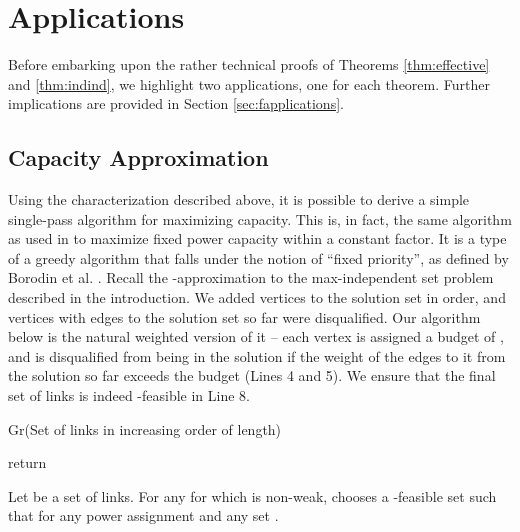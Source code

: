\documentclass[11pt]{amsart}
\begin{document}
\section{Applications}
\label{sec:applications}
Before embarking upon the rather technical proofs of Theorems
\ref{thm:effective} and \ref{thm:indind}, we highlight two
applications, one for each theorem. Further implications are provided
in Section \ref{sec:fapplications}.

\subsection{Capacity Approximation}
\label{sec:capacity}

Using the characterization described above, it is possible to derive a simple single-pass
algorithm for maximizing capacity. This is, in fact, the same
algorithm as used in \cite{SODA11} to maximize fixed power capacity
within a constant factor. 
It is a type of a greedy algorithm that falls under the notion of ``fixed priority'', as defined by 
Borodin et al. \cite{BorodinPriority}.
Recall the -approximation to the max-independent set problem described in the introduction. We added vertices to
the solution set in order, and vertices with edges to the solution set so far were disqualified. Our algorithm below is the natural weighted version of it -- each vertex is assigned a budget of , and is disqualified from being in the solution
if the weight of the edges to it from the solution so far exceeds the budget (Lines 4 and 5). We ensure that the final set of links is indeed -feasible in Line 8.




\begin{algorithm}                      \caption{Gr(Set  of links in increasing order of length)}          \label{alg1}                           \begin{algorithmic}[1]                    \STATE 
     \STATE 
     \IF{} \label{alg:acceptance}
     	\STATE 
     \ENDIF
     \ENDFOR
     \STATE return 
\end{algorithmic}
\label{alg1fig}
\end{algorithm}


\begin{theorem}
Let  be a set of links.
For any  for which  is non-weak,  chooses a -feasible set  
such that 
 for any power assignment  and any set .
\label{thm:appx}
\end{theorem}
\end{document}

